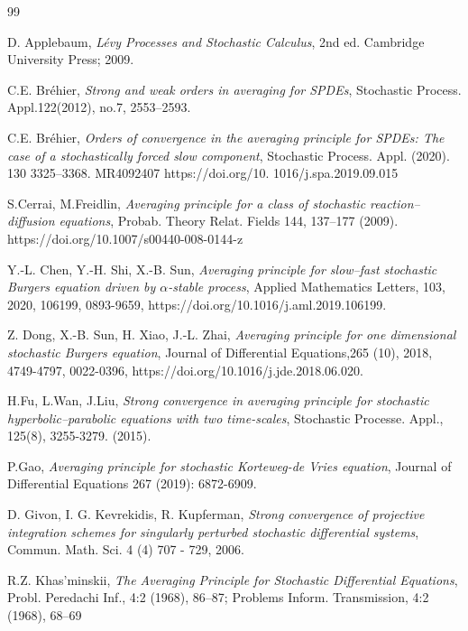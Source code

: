 \documentclass[11pt,reqno]{amsart}
\numberwithin{equation}{section}
\begin{document}
\begin{thebibliography}{99}
	

 D. Applebaum, \textit{L\'{e}vy Processes and Stochastic Calculus}, 2nd ed. Cambridge University Press; 2009.


C.E. Bréhier, \textit{Strong and weak orders in averaging for SPDEs}, Stochastic Process. Appl.122(2012), no.7, 2553–2593.
	
C.E. Bréhier, \textit{Orders of convergence in the averaging principle for SPDEs: The case of a stochastically forced slow component}, Stochastic Process. Appl. (2020). 130 3325–3368. MR4092407 https://doi.org/10.
1016/j.spa.2019.09.015	

S.Cerrai,  M.Freidlin,  \textit{Averaging principle for a class of stochastic reaction–diffusion equations}, Probab. Theory Relat. Fields 144, 137–177 (2009). https://doi.org/10.1007/s00440-008-0144-z






Y.-L. Chen, Y.-H. Shi, X.-B. Sun,
\textit{Averaging principle for slow–fast stochastic Burgers equation driven by $\alpha$-stable process},
Applied Mathematics Letters, 103, 2020,
106199, 0893-9659, https://doi.org/10.1016/j.aml.2019.106199.


Z. Dong, X.-B. Sun, H. Xiao, J.-L. Zhai,
\textit{Averaging principle for one dimensional stochastic Burgers equation},
Journal of Differential Equations,265 (10),
2018, 4749-4797, 0022-0396,
https://doi.org/10.1016/j.jde.2018.06.020.

 H.Fu,  L.Wan,  J.Liu,  \textit{Strong convergence in averaging principle for stochastic hyperbolic–parabolic equations with two time-scales}, Stochastic Processe. Appl., 125(8), 3255-3279. (2015).

 P.Gao, \textit{Averaging principle for stochastic Korteweg-de Vries equation}, Journal of Differential Equations 267 (2019): 6872-6909.


D. Givon, I. G. Kevrekidis, R. Kupferman, \textit{Strong convergence of projective integration schemes for singularly perturbed stochastic differential systems}, Commun. Math. Sci. 4 (4) 707 - 729, 2006.

R.Z. Khas'minskii, \textit{The Averaging Principle for Stochastic Differential Equations}, Probl. Peredachi Inf., 4:2 (1968), 86–87; Problems Inform. Transmission, 4:2 (1968), 68–69
	

\end{thebibliography}
\end{document}
